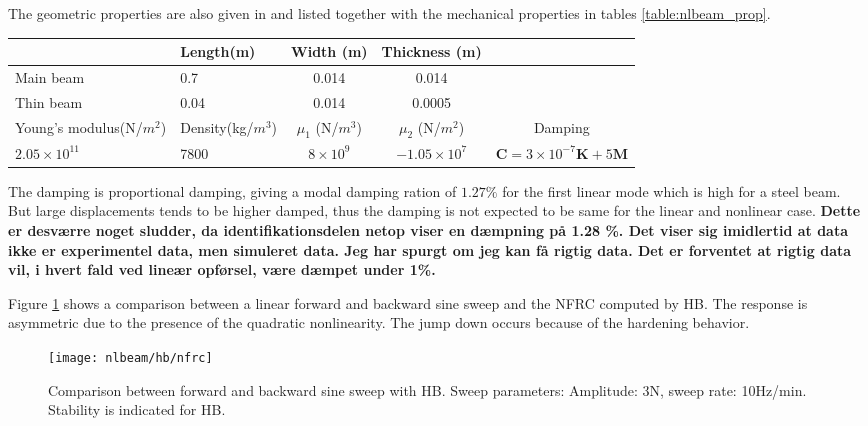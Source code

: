 The geometric properties are also given in \autocite{lenaerts2003a} and listed
together with the mechanical properties in tables \ref{table:nlbeam_prop}.
\begin{center}
  \begin{tabular}{p{3.1cm}p{2cm}*{3}{c}}
    \hline
  & Length(m) & Width (m) & Thickness (m) \\
  \hline
  Main beam & 0.7 & 0.014 & 0.014 \\
  Thin beam & 0.04 & 0.014 & 0.0005 \\
  \hline
  Young's modulus\newline (N/$m^2$) & Density\newline (kg/$m^3$) & $\mu_1$ (N/$m^3$) & $\mu_2$ (N/$m^2$) & Damping  \\
  \hline
  $2.05\times 10^{11}$ & 7800 & $8\times 10^{9}$ & $-1.05\times 10^{7}$ &  $\bm C = 3 \times 10^{-7} \bm K + 5\bm M$ \\
  \hline
\end{tabular}
\label{table:nlbeam_prop}
\end{center}


The damping is proportional damping, giving a modal damping ration of $1.27\%$
for the first linear mode which is high for a steel beam. But large
displacements tends to be higher damped, thus the damping is not expected to be
same for the linear and nonlinear case.
\textbf{Dette er desværre noget sludder, da identifikationsdelen netop
  viser en dæmpning på 1.28 \%. Det viser sig imidlertid at data ikke er
  experimentel data, men simuleret data. Jeg har spurgt om jeg kan få rigtig
  data. Det er forventet at rigtig data vil, i hvert fald ved lineær opførsel,
  være dæmpet under 1\%.}


Figure \ref{fig:nlbeam_sweep} shows a comparison between a linear forward and
backward sine sweep and the NFRC computed by HB. The response
is asymmetric due to the presence of the quadratic nonlinearity. The jump down
occurs because of the hardening behavior.

\begin{figure}[!ht]
  \centering
  \texttt{[image: nlbeam/hb/nfrc]}
  \caption{Comparison between forward and backward sine sweep with HB. Sweep
    parameters: Amplitude: 3N, sweep rate: 10Hz/min. Stability is indicated for
    HB.}
  \label{fig:nlbeam_sweep}
\end{figure}

